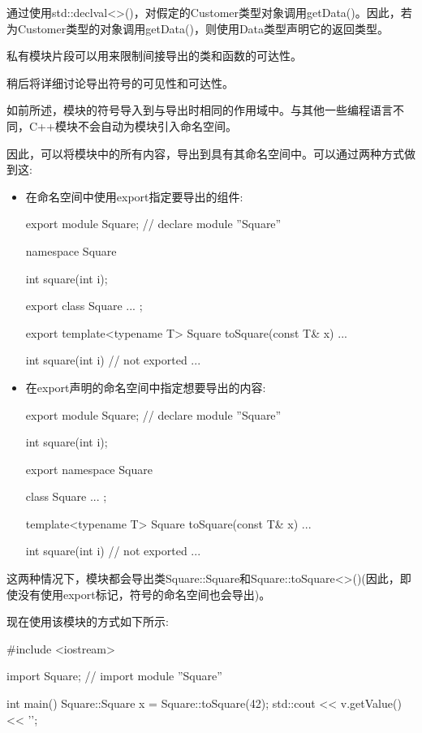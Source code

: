 通过使用std::declval<>()，对假定的Customer类型对象调用getData()。因此，若为Customer类型的对象调用getData()，则使用Data类型声明它的返回类型。

私有模块片段可以用来限制间接导出的类和函数的可达性。

稍后将详细讨论导出符号的可见性和可达性。


如前所述，模块的符号导入到与导出时相同的作用域中。与其他一些编程语言不同，C++模块不会自动为模块引入命名空间。

因此，可以将模块中的所有内容，导出到具有其命名空间中。可以通过两种方式做到这:

\begin{itemize}
\item 
在命名空间中使用export指定要导出的组件:
 
\begin{cpp}
export module Square; // declare module ”Square”

namespace Square {
	int square(int i);
	
	export class Square {
		...
	};
	
	export template<typename T>
	Square toSquare(const T& x) {
		...
	}
	
	int square(int i) { // not exported
		...
	}
}
\end{cpp}

\item 
在export声明的命名空间中指定想要导出的内容:

\begin{cpp}
export module Square; // declare module ”Square”

int square(int i);

export namespace Square {
	class Square {
		...
	};
	
	template<typename T>
	Square toSquare(const T& x) {
		...
	}
}

int square(int i) { // not exported
	...
}
\end{cpp}

\end{itemize}

这两种情况下，模块都会导出类Square::Square和Square::toSquare<>()(因此，即使没有使用export标记，符号的命名空间也会导出)。

现在使用该模块的方式如下所示:

\begin{cpp}
#include <iostream>

import Square; // import module ”Square”

int main()
{
	Square::Square x = Square::toSquare(42);
	std::cout << v.getValue() << '\n';
}
\end{cpp}

